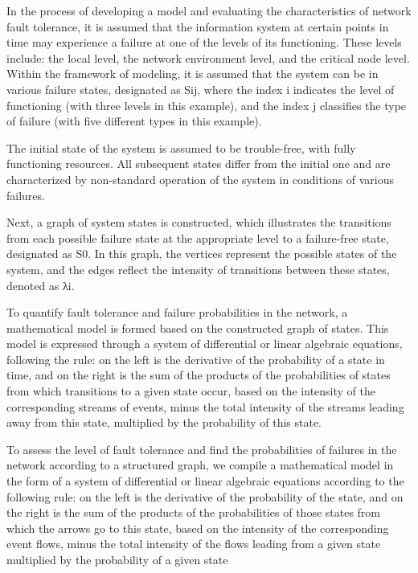 \begin{multicols}{2}
In the process of developing a model and evaluating the characteristics
of network fault tolerance, it is assumed that the information system at
certain points in time may experience a failure at one of the levels of
its functioning. These levels include: the local level, the network
environment level, and the critical node level. Within the framework of
modeling, it is assumed that the system can be in various failure
states, designated as Sij, where the index i indicates the level of
functioning (with three levels in this example), and the index j
classifies the type of failure (with five different types in this
example).

The initial state of the system is assumed to be trouble-free, with
fully functioning resources. All subsequent states differ from the
initial one and are characterized by non-standard operation of the
system in conditions of various failures.

Next, a graph of system states is constructed, which illustrates the
transitions from each possible failure state at the appropriate level to
a failure-free state, designated as S0. In this graph, the vertices
represent the possible states of the system, and the edges reflect the
intensity of transitions between these states, denoted as λi.

To quantify fault tolerance and failure probabilities in the network, a
mathematical model is formed based on the constructed graph of states.
This model is expressed through a system of differential or linear
algebraic equations, following the rule: on the left is the derivative
of the probability of a state in time, and on the right is the sum of
the products of the probabilities of states from which transitions to a
given state occur, based on the intensity of the corresponding streams
of events, minus the total intensity of the streams leading away from
this state, multiplied by the probability of this state.

To assess the level of fault tolerance and find the probabilities of
failures in the network according to a structured graph, we compile a
mathematical model in the form of a system of differential or linear
algebraic equations according to the following rule: on the left is the
derivative of the probability of the state, and on the right is the sum
of the products of the probabilities of those states from which the
arrows go to this state, based on the intensity of the corresponding
event flows, minus the total intensity of the flows leading from a given
state multiplied by the probability of a given state


\end{multicols}
